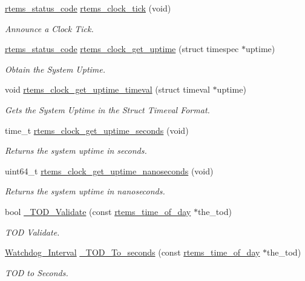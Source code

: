 \begin{DoxyCompactItemize}
\mbox{\hyperlink{group__ClassicStatus_ga545d41846817eaba6143d52ee4d9e9fe}{rtems\+\_\+status\+\_\+code}} \mbox{\hyperlink{group__ClassicClock_ga4077e5036c6378d557be5c22ba30812d}{rtems\+\_\+clock\+\_\+tick}} (void)
\begin{DoxyCompactList}\small\item\em Announce a Clock Tick. \end{DoxyCompactList}\item 
\mbox{\hyperlink{group__ClassicStatus_ga545d41846817eaba6143d52ee4d9e9fe}{rtems\+\_\+status\+\_\+code}} \mbox{\hyperlink{group__ClassicClock_ga634e38a96a2ba53cc7f7c99f263ffdff}{rtems\+\_\+clock\+\_\+get\+\_\+uptime}} (struct timespec $\ast$uptime)
\begin{DoxyCompactList}\small\item\em Obtain the System Uptime. \end{DoxyCompactList}\item 
void \mbox{\hyperlink{group__ClassicClock_ga393bdba39f4e590ee5db5e837204e6ec}{rtems\+\_\+clock\+\_\+get\+\_\+uptime\+\_\+timeval}} (struct timeval $\ast$uptime)
\begin{DoxyCompactList}\small\item\em Gets the System Uptime in the Struct Timeval Format. \end{DoxyCompactList}\item 
time\+\_\+t \mbox{\hyperlink{group__ClassicClock_ga31eb8dcc4fffd67697ece9db621965e6}{rtems\+\_\+clock\+\_\+get\+\_\+uptime\+\_\+seconds}} (void)
\begin{DoxyCompactList}\small\item\em Returns the system uptime in seconds. \end{DoxyCompactList}\item 
uint64\+\_\+t \mbox{\hyperlink{group__ClassicClock_ga0e2b9de0054d75a0820203f00e152aa7}{rtems\+\_\+clock\+\_\+get\+\_\+uptime\+\_\+nanoseconds}} (void)
\begin{DoxyCompactList}\small\item\em Returns the system uptime in nanoseconds. \end{DoxyCompactList}\item 
bool \mbox{\hyperlink{group__ClassicClock_ga80a0ad7cf75ab4da2f69eea860daeb77}{\+\_\+\+T\+O\+D\+\_\+\+Validate}} (const \mbox{\hyperlink{structrtems__time__of__day}{rtems\+\_\+time\+\_\+of\+\_\+day}} $\ast$the\+\_\+tod)
\begin{DoxyCompactList}\small\item\em T\+OD Validate. \end{DoxyCompactList}\item 
\mbox{\hyperlink{group__RTEMSScoreWatchdog_gaa1834fd7531ca9bb5c4ca6fd990388d5}{Watchdog\+\_\+\+Interval}} \mbox{\hyperlink{group__ClassicClock_gab5bfb9a415bb9cbb6c9132d8b3de8f61}{\+\_\+\+T\+O\+D\+\_\+\+To\+\_\+seconds}} (const \mbox{\hyperlink{structrtems__time__of__day}{rtems\+\_\+time\+\_\+of\+\_\+day}} $\ast$the\+\_\+tod)
\begin{DoxyCompactList}\small\item\em T\+OD to Seconds. \end{DoxyCompactList}\end{DoxyCompactItemize}


